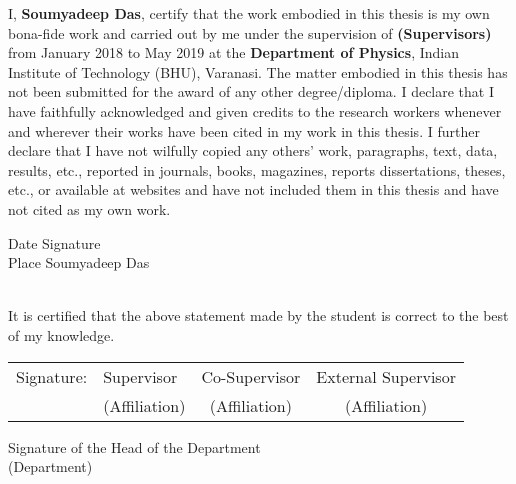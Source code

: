 
\begin{declaration}
	
	I, \textbf{Soumyadeep Das}, certify that the work embodied in this thesis is my own bona-fide work and carried out by me under the supervision of \textbf{(Supervisors)} from January 2018 to May 2019 at the \textbf{Department of Physics}, Indian Institute of Technology (BHU), Varanasi. The matter embodied in this thesis has not been submitted for the award of any other degree/diploma. I declare that I have faithfully acknowledged and given credits to the research workers whenever and wherever their works have been cited in my work in this thesis. I further declare that I have not wilfully copied any others' work, paragraphs, text, data, results, etc., reported in journals, books, magazines, reports dissertations, theses, etc., or available at websites and have not included them in this thesis and have not cited as my own work.\\
	\flushleft
	
	
	
	Date   \hspace{5.1cm}  Signature      \\
	Place \hspace{5cm} Soumyadeep Das \\
	
	\vfill
	
	 \\
	\flushleft
	It is certified that the above statement made by the student is correct to the best of my knowledge. \\
	\vspace*{0.6cm}
	
	
	\begin{table}[htbp]
		{ \bfseries
			\begin{tabular}{llcc}
				Signature: \hspace{0.5cm} & Supervisor            \hspace{1cm}        & Co-Supervisor   \hspace{1cm}  &  External Supervisor   \\
				\hspace{0.5cm}  & (Affiliation)             \hspace{1cm}       &  (Affiliation)        \hspace{1cm}       &  (Affiliation)     
			\end{tabular} 
		}
	\end{table}
	\vfill \centering Signature of the Head of the Department \\ (Department)
	
\end{declaration}

